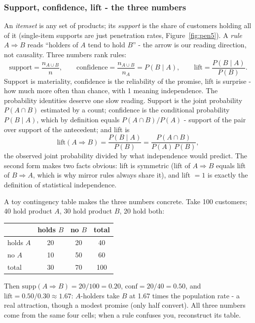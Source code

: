 \documentclass[11pt,a4paper]{article}
\begin{document}
\subsubsection{Support, confidence, lift - the three numbers}
An \emph{itemset} is any set of products; its \emph{support} is the share
of customers holding all of it (single-item supports are just penetration
rates, Figure~\ref{fig:pen5}). A \emph{rule} $A \Rightarrow B$ reads
``holders of $A$ tend to hold $B$'' - the arrow is our reading
direction, not causality. Three numbers rank rules:
\[
  \text{support} = \frac{n_{A\cup B}}{n}, \qquad
  \text{confidence} = \frac{n_{A\cup B}}{n_A} = P(B \mid A), \qquad
  \text{lift} = \frac{P(B \mid A)}{P(B)} .
\]
Support is materiality, confidence is the reliability of the promise, lift
is surprise - how much more often than chance, with 1 meaning
independence. The probability identities deserve one slow reading.
Support is the joint probability $P(A \cap B)$ estimated by a count;
confidence is the conditional probability $P(B \mid A)$, which by
definition equals $P(A \cap B)/P(A)$ - support of the pair over support
of the antecedent; and lift is
\[
  \text{lift}(A \Rightarrow B)
  = \frac{P(B \mid A)}{P(B)}
  = \frac{P(A \cap B)}{P(A)\,P(B)},
\]
the observed joint probability divided by what independence would
predict. The second form makes two facts obvious: lift is symmetric
(lift of $A \Rightarrow B$ equals lift of $B \Rightarrow A$, which is why
mirror rules always share it), and lift $=1$ is exactly the definition of
statistical independence.

A toy contingency table makes the three numbers concrete. Take 100
customers; 40 hold product $A$, 30 hold product $B$, 20 hold both:

\begin{center}\small
\begin{tabular}{@{}lccc@{}}
\toprule
 & holds $B$ & no $B$ & total \\
\midrule
holds $A$ & 20 & 20 & 40 \\
no $A$    & 10 & 50 & 60 \\
\midrule
total     & 30 & 70 & 100 \\
\bottomrule
\end{tabular}
\end{center}

Then $\text{supp}(A \Rightarrow B) = 20/100 = 0.20$,
$\text{conf} = 20/40 = 0.50$, and
$\text{lift} = 0.50 / 0.30 \approx 1.67$: $A$-holders take $B$ at
1.67 times the population rate - a real attraction, though a modest
promise (only half convert). All three numbers come from the same four
cells; when a rule confuses you, reconstruct its table.
\end{document}
